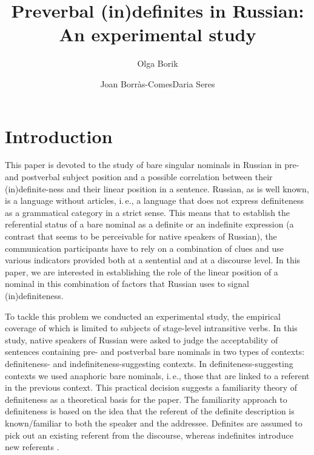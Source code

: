 \documentclass[output=paper]{langsci/langscibook}
\author{Olga Borik\affiliation{Universidad Nacional de Educaci\'on a Distancia (UNED), Madrid}\and Joan Borràs-Comes\affiliation{Universitat Aut\`onoma de Barcelona \& Universitat Pompeu Fabra, Barcelona}\lastand Daria Seres\affiliation{Universitat Aut\`onoma de Barcelona}
}
\title{Preverbal (in)definites in Russian: An experimental study}
\begin{document}
\maketitle

\section{Introduction}\label{2sec:1}
This paper is devoted to the study of bare singular nominals in Russian in pre- and postverbal subject position and a possible correlation between their (in)definite-ness and their linear position in a sentence. Russian, as is well known, is a language without articles, i.\,e., a language that does not express definiteness as a grammatical category in a strict sense. This means that to establish the referential status of a bare nominal as a definite or an indefinite expression (a contrast that seems to be perceivable for native speakers of Russian), the communication participants have to rely on a combination of clues and use various indicators provided both at a sentential and at a discourse level. In this paper, we are interested in establishing the role of the linear position of a nominal in this combination of factors that Russian uses to signal (in)definiteness.

{
To tackle this problem we conducted an experimental study, the empirical coverage of which is limited to subjects of stage-level intransitive verbs. In this study, native speakers of Russian were asked to judge the acceptability of sentences containing pre- and postverbal bare nominals in two types of contexts: definiteness- and indefiniteness-suggesting contexts. In definiteness-suggesting contexts we used anaphoric bare nominals, i.\,e., those that are linked to a referent in the previous context. This practical decision suggests a familiarity theory of definiteness \citep{christophersen:39,heim:82} as a theoretical basis for the paper. The familiarity approach to definiteness is based on the idea that the referent of the definite description is known/familiar to both the speaker and the addressee. Definites are assumed to pick out an existing referent from the discourse, whereas indefinites introduce new referents \citep[see specifically][]{heim:82,kamp:81}.
}
\end{document}
